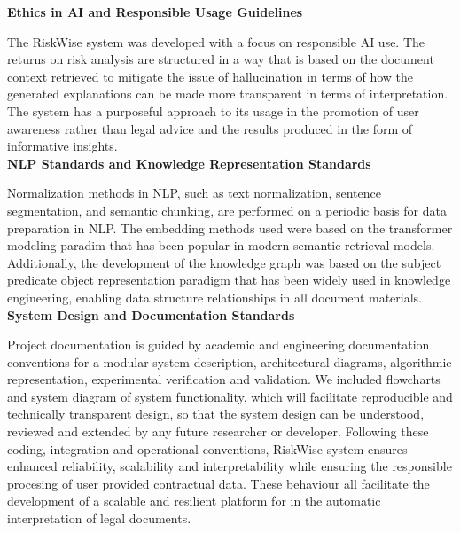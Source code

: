 \textbf{Ethics in AI and Responsible Usage Guidelines}

The RiskWise system was developed with a focus on responsible AI use.
The returns on risk analysis are structured in a way that is based on
the document context retrieved to mitigate the issue of hallucination
in terms of how the generated explanations can be made more
transparent in terms of interpretation. The system has a purposeful 
approach to its usage in the promotion of user awareness rather than 
legal advice and the results produced in the form of informative insights.
\\

\textbf{NLP Standards and Knowledge Representation Standards}

Normalization methods in NLP, such as text normalization, sentence
segmentation, and semantic chunking, are performed on a periodic
basis for data preparation in NLP. The embedding methods used were
based on the transformer modeling paradim that has been popular in
modern semantic retrieval models. Additionally, the development of
the knowledge graph was based on the subject predicate object
representation paradigm that has been widely used in knowledge
engineering, enabling data structure relationships in all document materials.
\\

\textbf{System Design and Documentation Standards}

Project documentation is guided by academic and engineering
documentation conventions for a modular system description,
architectural diagrams, algorithmic representation, experimental
verification and validation. We included flowcharts and system
diagram of system functionality, which will facilitate reproducible
and technically transparent design, so that the system design can be
understood, reviewed and extended by any future researcher or developer.
Following these coding, integration and operational conventions,
RiskWise system ensures enhanced reliability, scalability and
interpretability while ensuring the responsible procesing of user
provided contractual data. These behaviour all facilitate the
development of a scalable and resilient platform for in the automatic
interpretation of legal documents.


